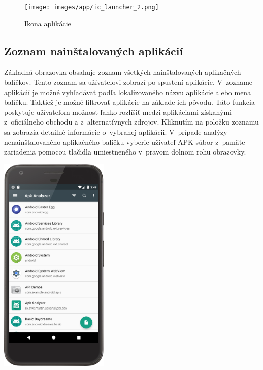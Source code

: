 \begin{figure}[htb]
	\centering
    \texttt{[image: images/app/ic\_launcher\_2.png]}
	\caption{Ikona aplikácie}
	\label{fig:icon}
\end{figure}


\subsection{Zoznam nainštalovaných aplikácií}
\begin{minipage}[H]{\textwidth}
\begin{minipage}[t]{0.48\textwidth}
Základná obrazovka obsahuje zoznam všetkých nainštalovaných aplikačných balíčkov. Tento zoznam sa užívateľovi zobrazí po spustení aplikácie. V~zozname aplikácií je možné vyhľadávať podľa lokalizovaného názvu aplikácie alebo mena balíčku. Taktiež je možné filtrovať aplikácie na základe ich pôvodu. Táto funkcia poskytuje užívateľom možnosť ľahko rozlíšiť medzi aplikáciami získanými z~oficiálneho obchodu a z~alternatívnych zdrojov. Kliknutím na položku zoznamu sa zobrazia detailné informácie o~vybranej aplikácii. V~prípade analýzy nenainštalovaného aplikačného balíčku vyberie užívateľ APK súbor z~pamäte zariadenia pomocou tlačidla umiestneného v~pravom dolnom rohu obrazovky.
\end{minipage}%
\hfill
\centering
\begin{minipage}[t][][b]{0.45\textwidth}
\centering
\includegraphics[width=5.2cm]{images/app/list_device.png}
\centering
{}
\label{fig:app-list}
\end{minipage}%
\end{minipage}

